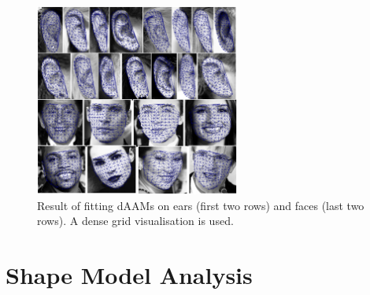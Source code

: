 \begin{figure}[h]
\centering
\includegraphics[width=0.6\textwidth]{supports/Fittings/fittings}
\caption{Result of fitting dAAMs on ears (first two rows) and faces (last two rows). A dense grid visualisation is used.}
\label{fig:fr}
\end{figure}


\section{Shape Model Analysis}
\label{sec:modelanalysis}

